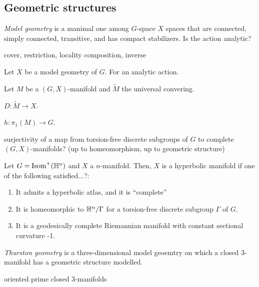 \documentclass[a4paper]{article}
\begin{document}
\subsection{Geometric structures}



\emph{Model geometry} is a manimal one among $G$-space $X$ spaces that are connected, simply connected, transitive, and has compact stabilizers.
Is the action analytic?

\begin{defn}[Pseudogroup]
cover, restriction, locality
composition, inverse
\end{defn}
\begin{defn}[$(G,X)$-structure]
Let $X$ be a model geometry of $G$.
For an analytic action.
\end{defn}
\begin{defn}
Let $M$ be a $(G,X)$-manifold and $\tilde M$ the universal convering.
\begin{parts}
\item $D:\tilde M\to X$.
\item $h:\pi_1(M)\to G$.
\end{parts}
\end{defn}

surjectivity of a map from torsion-free discrete subgroups of $G$ to complete $(G,X)$-manifolds?
(up to homeomorphism, up to geometric structure)




\begin{defn}
Let $G=\operatorname{Isom}^+(\mathbb{H}^n)$ and $X$ a $n$-manifold.
Then, $X$ is a hyperbolic manifold if one of the following satisfied...?:
\begin{enumerate}
\item It admits a hyperbolic atlas, and it is ``complete''
\item It is homeomorphic to $\mathbb{H}^n/\Gamma$ for a torsion-free discrete subgroup $\Gamma$ of $G$.
\item It is a geodesically complete Riemannian manifold with constant sectional curvature -1.
\end{enumerate}
\end{defn}





\emph{Thurston geometry} is a three-dimensional model geoemtry on which a closed 3-manifold has a geometric structure modelled.

oriented prime closed 3-manifolds
\end{document}
